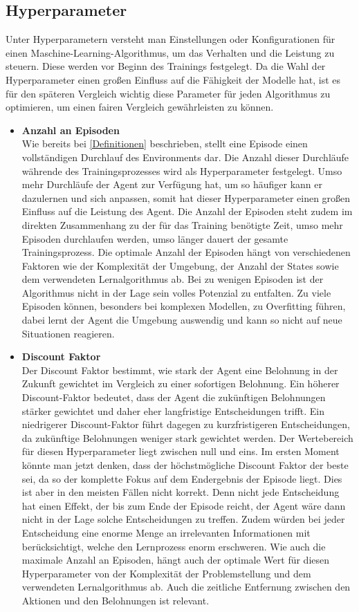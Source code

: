 \subsection{Hyperparameter}
Unter Hyperparametern versteht man Einstellungen oder Konfigurationen für einen Maschine-Learning-Algorithmus, um das Verhalten und die Leistung zu steuern. Diese werden vor Beginn des Trainings festgelegt. Da die Wahl der Hyperparameter einen großen Einfluss auf die Fähigkeit der Modelle hat, ist es für den späteren Vergleich wichtig diese Parameter für jeden Algorithmus zu optimieren, um einen fairen Vergleich gewährleisten zu können.
\begin{itemize}
    \item \textbf{Anzahl an Episoden}\\
    Wie bereits bei \ref*{Definitionen}  beschrieben, stellt eine Episode einen vollständigen Durchlauf des Environments dar. Die Anzahl dieser Durchläufe währende des Trainingsprozesses wird als Hyperparameter festgelegt. Umso mehr Durchläufe der Agent zur Verfügung hat, um so häufiger kann er dazulernen und sich anpassen, somit hat dieser Hyperparameter einen großen Einfluss auf die Leistung des Agent. Die Anzahl der Episoden steht zudem im direkten Zusammenhang zu der für das Training benötigte Zeit, umso mehr Episoden durchlaufen werden, umso länger dauert der gesamte Trainingsprozess. Die optimale Anzahl der Episoden hängt von verschiedenen Faktoren wie der Komplexität der Umgebung, der Anzahl der States sowie dem verwendeten Lernalgorithmus ab. Bei zu wenigen Episoden ist der Algorithmus nicht in der Lage sein volles Potenzial zu entfalten. Zu viele Episoden können, besonders bei komplexen Modellen, zu Overfitting führen, dabei lernt der Agent die Umgebung auswendig und kann so nicht auf neue Situationen reagieren.
    \item \textbf{Discount Faktor}\\
    Der Discount Faktor bestimmt, wie stark der Agent eine Belohnung in der Zukunft gewichtet im Vergleich zu einer sofortigen Belohnung. Ein höherer Discount-Faktor bedeutet, dass der Agent die zukünftigen Belohnungen stärker gewichtet und daher eher langfristige Entscheidungen trifft. Ein niedrigerer Discount-Faktor führt dagegen zu kurzfristigeren Entscheidungen, da zukünftige Belohnungen weniger stark gewichtet werden. Der Wertebereich für diesen Hyperparameter liegt zwischen null und eins. Im ersten Moment könnte man jetzt denken, dass der höchstmögliche Discount Faktor der beste sei, da so der komplette Fokus auf dem Endergebnis der Episode liegt. Dies ist aber in den meisten Fällen nicht korrekt. Denn nicht jede Entscheidung hat einen Effekt, der bis zum Ende der Episode reicht, der Agent wäre dann nicht in der Lage solche Entscheidungen zu treffen. Zudem würden bei jeder Entscheidung eine enorme Menge an irrelevanten Informationen mit berücksichtigt, welche den Lernprozess enorm erschweren. Wie auch die maximale Anzahl an Episoden, hängt auch der optimale Wert für diesen Hyperparameter von der Komplexität der Problemstellung und dem verwendeten Lernalgorithmus ab. Auch die zeitliche Entfernung zwischen den Aktionen und den Belohnungen ist relevant.

\end{itemize}
